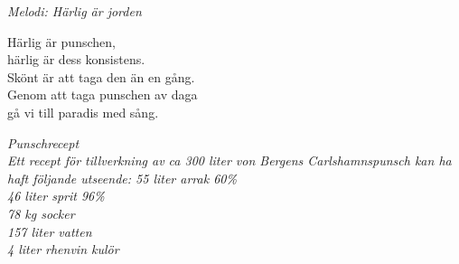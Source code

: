{\footnotesize\textit{Melodi: Härlig är jorden}}\par
\vspace{10pt}
Härlig är punschen,\\
härlig är dess konsistens.\\
Skönt är att taga den än en gång.\\
Genom att taga punschen av daga\\
gå vi till paradis med sång.\par
\vspace{10pt}
{\footnotesize\textit{Punschrecept\\
Ett recept för tillverkning av ca 300 liter
von Bergens Carlshamnspunsch kan ha haft följande utseende:
55 liter arrak 60\%\\
46 liter sprit 96\%\\
78 kg socker\\
157 liter vatten\\
4 liter rhenvin
kulör}}
